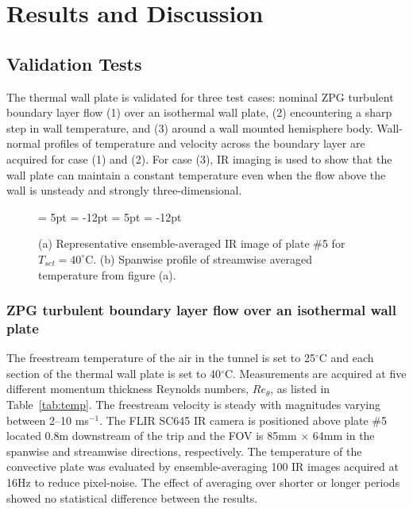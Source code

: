 \chapter{Results and Discussion}

\section{Validation Tests}
The thermal wall plate is validated for three test cases: nominal ZPG turbulent boundary layer flow (1) over an isothermal wall plate, (2) encountering a sharp step in wall temperature, and (3) around a wall mounted hemisphere body. 
Wall-normal profiles of temperature and velocity across  the boundary layer are acquired for case (1) and (2). 
For case (3), IR imaging is used to show that the wall plate can maintain a constant temperature even when the flow above the wall is unsteady and strongly three-dimensional. 

\begin{figure}[h!]
  \begin{center}
  {\subfigcapskip = 5pt \subfigcapmargin = -12pt }
   {\subfigcapskip = 5pt \subfigcapmargin = -12pt  }
  \end{center}
\caption{(a) Representative ensemble-averaged IR image of plate \#5 for $T_{set} = 40^\circ$C. (b) Spanwise profile of streamwise averaged temperature from figure (a).} 
\label{fig:IR-ZPG}
\end{figure}


\subsection{ZPG turbulent boundary layer flow over an isothermal wall plate}
The freestream temperature  of the air in the tunnel is set to 25$^\circ$C and each section of the thermal wall plate is set to 40$^\circ$C.
Measurements are acquired at five different momentum thickness Reynolds numbers, $Re_\theta$, as listed in Table~\ref{tab:temp}. 
The freestream velocity is steady with magnitudes varying between 2--10 ms$^{-1}$. 
The FLIR SC645 IR camera is positioned above plate \#5 located 0.8m downstream of the trip and the FOV is 85mm $\times$ 64mm in the spanwise and streamwise directions, respectively. 
The temperature of the convective plate was evaluated by ensemble-averaging 100 IR images acquired at 16Hz to reduce pixel-noise. 
The effect of averaging over shorter or longer periods showed no statistical difference between the results.

